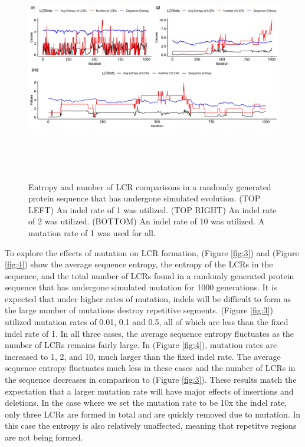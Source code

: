 \documentclass{article}
\providecommand{\figref}[1]{(Figure \ref{#1})}  %
\begin{document}
\begin{figure}[H]
	\includegraphics[width=18cm, height=10cm]{im1-2-10.jpeg}
	\caption{Entropy and number of LCR comparisons in a randomly generated protein sequence that has undergone simulated evolution. (TOP LEFT) An indel rate of 1 was utilized. (TOP RIGHT) An indel rate of 2 was utilized. (BOTTOM) An indel rate of 10 was utilized. A mutation rate of 1 was used for all.}
	\label{fig:2}
\end{figure}

To explore the effects of mutation on LCR formation, \figref{fig:3} and \figref{fig:4} show the average sequence entropy, the entropy of the LCRs in the sequence, and the total number of LCRs found in a randomly generated protein sequence that has undergone simulated mutation for 1000 generations. It is expected that under higher rates of mutation, indels will be difficult to form as the large number of mutations destroy repetitive segments. \figref{fig:3} utilized mutation rates of 0.01, 0.1 and 0.5, all of which are less than the fixed indel rate of 1. In all three cases, the average sequence entropy fluctuates as the number of LCRs remains fairly large. In \figref{fig:4}, mutation rates are increased to 1, 2, and 10, much larger than the fixed indel rate. The average sequence entropy fluctuates much less in these cases and the number of LCRs in the sequence decreases in comparison to \figref{fig:3}. These results match the expectation that a larger mutation rate will have major effects of insertions and deletions. In the case where we set the mutation rate to be 10x the indel rate, only three LCRs are formed in total and are quickly removed due to mutation. In this case the entropy is also relatively unaffected, meaning that repetitve regions are not being formed.
\end{document}
